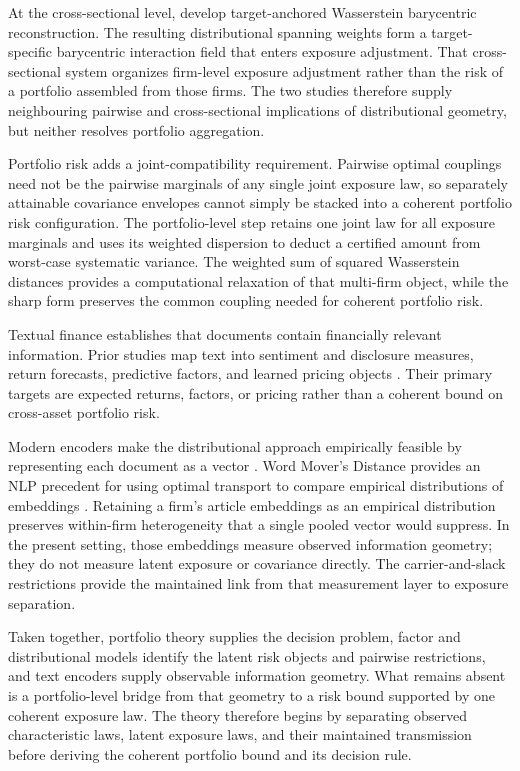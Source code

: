 At the cross-sectional level, \citet{gawronsky_spatial_2027} develop
target-anchored Wasserstein barycentric reconstruction.
The resulting distributional spanning weights form a target-specific barycentric
interaction field that enters exposure adjustment.
That cross-sectional system organizes firm-level exposure adjustment rather
than the risk of a portfolio assembled from those firms.
The two studies therefore supply neighbouring pairwise and cross-sectional
implications of distributional geometry, but neither resolves portfolio aggregation.

Portfolio risk adds a joint-compatibility requirement.
Pairwise optimal couplings need not be the pairwise marginals of any single
joint exposure law, so separately attainable covariance envelopes cannot
simply be stacked into a coherent portfolio risk configuration.
The portfolio-level step retains one joint law for all exposure marginals and
uses its weighted dispersion to deduct a certified amount from worst-case
systematic variance.
The weighted sum of squared Wasserstein distances provides a computational
relaxation of that multi-firm object, while the sharp form preserves the common
coupling needed for coherent portfolio risk.

Textual finance establishes that documents contain financially relevant information.
Prior studies map text into sentiment and disclosure measures, return
forecasts, predictive factors, and learned pricing objects
\citep{tetlock_giving_2007,loughran2011liability,
  gentzkow_text_as_data_2019,ke_predicting_returns_2019,
cong_textual_factors_2024,distaso_string_2024,wang2025newsnet}.
Their primary targets are expected returns, factors, or pricing rather than a
coherent bound on cross-asset portfolio risk.

Modern encoders make the distributional approach empirically feasible by
representing each document as a vector
\citep{reimers_sentencebert_2019,qwen3_embedding_2025}.
Word Mover's Distance provides an NLP precedent for using optimal transport
to compare empirical distributions of embeddings \citep{kusner_word_embeddings_2015}.
Retaining a firm's article embeddings as an empirical distribution preserves
within-firm heterogeneity that a single pooled vector would suppress.
In the present setting, those embeddings measure observed information
geometry; they do not measure latent exposure or covariance directly.
The carrier-and-slack restrictions provide the maintained link from that
measurement layer to exposure separation.

Taken together, portfolio theory supplies the decision problem, factor and
distributional models identify the latent risk objects and pairwise
restrictions, and text encoders supply observable information geometry.
What remains absent is a portfolio-level bridge from that geometry to a risk
bound supported by one coherent exposure law.
The theory therefore begins by separating observed characteristic laws,
latent exposure laws, and their maintained transmission before deriving the
coherent portfolio bound and its decision rule.
